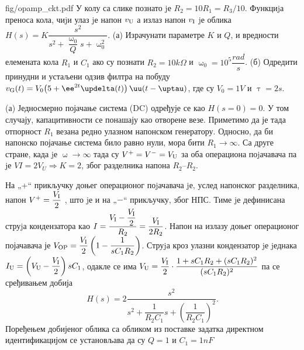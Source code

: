 \mnDifficult
\begin{slikaDesno}{fig/opamp_ckt.pdf}
    \PID
    У колу са слике познато jе 
    $R_2 = 10 R_1 = R_3/10$. Функциjа преноса
    кола, чиjи улаз jе напон $v_{\rm U}$ а излаз напон 
    $v_{\rm I}$ jе облика
    $
    {H(s) = K\dfrac{s^2}{s^2 + \dfrac{\upomega_0}{Q} s + \upomega_0^2 }}
    $.
    (а) Израчунати параметре $K$ и $Q$,
    и вредности елемената кола $R_1$ и $C_1$ ако су познати $R_2 = 10\unit{k\Omega}$ и 
    $\upomega_0 = 10^5\unit{\dfrac{rad}{s}}$.
    (б) Одредити принудни и устаљени одзив филтра на побуду
    $v_{\rm G}(t) = V_0 \bigl(5 + \ee^{2t} \updelta(t) \bigr)\,\uu(t - \uptau)$, где су $V_0 = 1\unit{V}$ 
    и $\uptau = 2\unit{s}$. 
\end{slikaDesno}

\RESENJE

(а) 
Једносмерно појачање система (DC) одређује се као
$H(s = 0) = 0$. У том случају, капацитивности се понашају као отворене везе. 
Приметимо да је тада отпорност $R_1$ везана редно улазном напонском генератору. 
Односно, да би напонско појачање система било равно нули, мора бити 
$R_1 \to \infty$. 
Са друге стране, 
када jе $\upomega \to \infty$ тада су 
$V^+ = V^- = V_{\rm U}$ за оба операциона поjачавача па jе
$VI = 2V_U \Rightarrow K = 2$, због разделника напона $R_2$--$R_2$.

На „+“ прикључку доњег операционог поjачавача jе, услед напонског разделника, 
напон $V^+ = \dfrac{V_{\rm I}}2$ , што jе и на „$-$“ прикључку, због НПС.
Тиме jе дефинисана струjа кондензатора
као $I = \dfrac{V_{\rm I} - \dfrac{V_{\rm I}}{2}}{R_2} = \dfrac{V_{\rm I}}{2R_2}$.
Напон на излазу доњег операционог појачавача је 
$V_{\rm OP} = \dfrac{V_{\rm I}}{2} \left( 1 - \dfrac{1}{sC_1R_2} \right)$.
Струjа
кроз улазни кондензатор jе jеднака 
$I_{\rm U}
=
\left(
    V_{\rm U} 
    -
    \dfrac{V_{\rm I}}{2}
\right) sC_1$, одакле се има 
$V_{\rm U} = \dfrac{V_{\rm I}}{2}
\cdot
\dfrac{1 + sC_1R_2 + (sC_1R_2)^2 }{ (sC_1R_2)^2 }$
па се сређивањем добија
\begin{equation}
    H(s) = 2 \dfrac{s^2}{ 
        s^2 + \dfrac{1}{R_2 C_1} s + \left( \dfrac{1}{R_2 C_1} \right)^2
    }.
\end{equation}
Поређењем добијеног облика са обликом из поставке задатка директном идентификацијом 
се установљава да су $Q = 1$ и $C_1 = 1\unit{nF}$

